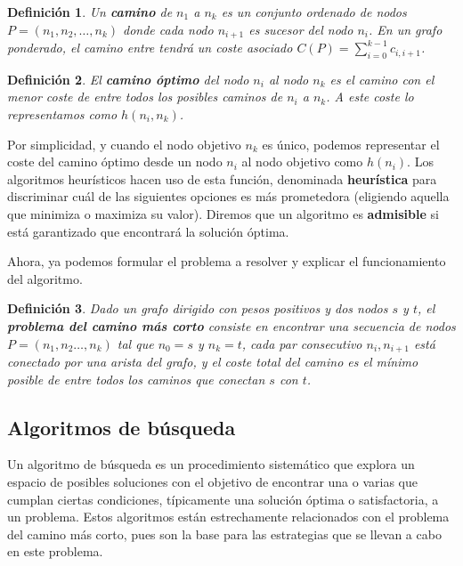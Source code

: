 \documentclass[a4paper,12pt]{article}
\newtheorem{defn}{Definición}
\begin{document}
\begin{defn}
Un \textbf{camino} de $n_1$ a $n_k$ es un conjunto ordenado de nodos $P = (n_1,n_2, \allowbreak \dots ,n_k)$ donde cada nodo $n_{i+1}$ es sucesor del nodo $n_i$. En un grafo ponderado, el camino entre tendrá un coste asociado $C(P) = \sum_{i=0}^{k-1}c_{i,i+1}$.
\end{defn}

\noindent 

\begin{defn}
El \textbf{camino óptimo} del nodo $n_i$ al nodo $n_k$ es el camino con el menor coste de entre todos los posibles caminos de $n_i$ a $n_k$. A este coste lo representamos como $h(n_i, n_k)$.
\end{defn}

\noindent Por simplicidad, y cuando el nodo objetivo $n_k$ es único, podemos representar el coste del camino óptimo desde un nodo $n_i$ al nodo objetivo como $h(n_i)$. Los algoritmos heurísticos hacen uso de esta función, denominada \textbf{heurística} para discriminar cuál de las siguientes opciones es más prometedora (eligiendo aquella que minimiza o maximiza su valor). Diremos que un algoritmo es \textbf{admisible} si está garantizado que encontrará la solución óptima.

Ahora, ya podemos formular el problema a resolver y explicar el funcionamiento del algoritmo.

\begin{defn}\label{def:shortest_path_problem}
Dado un grafo dirigido con pesos positivos y dos nodos $s$ y $t$, el \textbf{problema del camino más corto} consiste en encontrar una secuencia de nodos $P = (n_1, n_2 \dots, n_k)$ tal que $n_0 = s$ y $n_k = t$, cada par consecutivo $n_i, n_{i+1}$ está conectado por una arista del grafo, y el coste total del camino es el mínimo posible de entre todos los caminos que conectan $s$ con $t$.
\end{defn}








\subsection{Algoritmos de búsqueda}\label{sec:alg-busqueda}

Un algoritmo de búsqueda es un procedimiento sistemático que explora un espacio de posibles soluciones con el objetivo de encontrar una o varias que cumplan ciertas condiciones, típicamente una solución óptima o satisfactoria, a un problema. Estos algoritmos están estrechamente relacionados con el problema del camino más corto, pues son la base para las estrategias que se llevan a cabo en este problema. 
\end{document}
